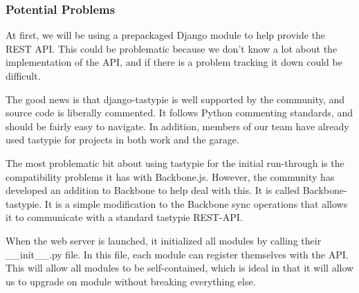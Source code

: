 \subsubsection{Potential Problems}

At first, we will be using a prepackaged Django module to help provide the REST API.
This could be problematic because we don't know a lot about the implementation of the API, and if there is a problem tracking it down could be difficult.

The good news is that django-tastypie is well supported by the community, and source code is liberally commented.
It follows Python commenting standards, and should be fairly easy to navigate.
In addition, members of our team have already used tastypie for projects in both work and the garage.

The most problematic bit about using tastypie for the initial run-through is the compatibility problems it has with Backbone.js.
However, the community has developed an addition to Backbone to help deal with this.
It is called Backbone-tastypie.
It is a simple modification to the Backbone sync operations that allows it to communicate with a standard tastypie REST-API.

When the web server is launched, it initialized all modules by calling their \_\_init\_\_.py file.
In this file, each module can register themselves with the API.
This will allow all modules to be self-contained, which is ideal in that it will allow us to upgrade on module without breaking everything else.
